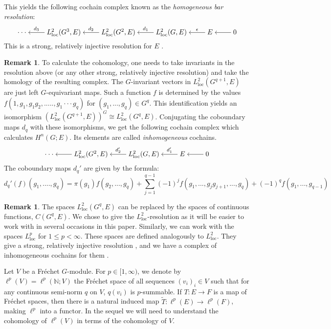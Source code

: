 \documentclass[12pt,reqno]{amsart}
\newcommand{\N}{\mathbb{N}}
\theoremstyle{definition}
\newtheorem{remark}[theorem]{Remark}
\begin{document}
This yields the following cochain complex known as the \emph{homogeneous bar resolution}:
\[
\begin{tikzcd}[cramped]
	{\cdot \cdot \cdot} & {L^2_{\mathrm{loc}}(G^3,E)} & {L^2_{\mathrm{loc}}(G^2,E)} & {L^2_{\mathrm{loc}}(G,E)} & E & 0
	\arrow["{d_3}"', from=1-2, to=1-1]
	\arrow["{d_2}"', from=1-3, to=1-2]
	\arrow["{d_1}"', from=1-4, to=1-3]
	\arrow["\epsilon"', from=1-5, to=1-4]
	\arrow[from=1-6, to=1-5]
\end{tikzcd}
\]
This is a strong, relatively injective resolution for $E$ \cite[Theorem~C.7]{Petersen}.
\begin{remark}\label{rem:inhomogeneous}
    To calculate the cohomology, one needs to take invariants in the resolution above (or any other strong, relatively injective resolution) and take the homology of the resulting complex. The $G$-invariant vectors in $L^2_{\mathrm{loc}}(G^{q+1},E)$ are just left $G$-equivariant maps. Such a function $f$ is determined by the values $f(1,g_1, g_1g_2,.....,g_1\cdot \cdot \cdot g_q)$ for $(g_1,...,g_q) \in G^q$. This identification yields an isomorphism $(L^2_{\mathrm{loc}}(G^{q+1},E))^G \cong L^2_{\mathrm{loc}}(G^q,E)$. Conjugating the coboundary maps $d_q$ with these isomorphisms, we get the following cochain complex which calculates $H^n(G;E)$. Its elements are called \emph{inhomogeneous} cochains.
    \[\begin{tikzcd}[cramped]
	{\cdot\cdot\cdot} & {L^2_{\mathrm{loc}}(G^2,E)} & {L^2_{\mathrm{loc}}(G,E)} & E & 0
	\arrow[from=1-2, to=1-1]
	\arrow["{d_2'}"', from=1-3, to=1-2]
	\arrow["{d_1'}"', from=1-4, to=1-3]
	\arrow[from=1-5, to=1-4]
    \end{tikzcd}\]
The coboundary maps $d_q'$ are given by the formula:    
    $$d_q'(f)(g_1,....,g_q) = \pi(g_1)f(g_2,...,g_q) + \sum_{j=1}^{q-1} (-1)^jf(g_1,...,g_j g_{j+1},...,g_q) + (-1)^q f(g_1,...,g_{q-1})$$
\end{remark}

\begin{remark}\label{rem:lp loc}
    The spaces $L^2_\mathrm{loc}(G^q,E)$ can be replaced by the spaces of continuous functions, $C(G^q,E)$. We chose to give the $L^2_{\mathrm{loc}}$-resolution as it will be easier to work with in several occasions in this paper. Similarly, we can work with the spaces $L^p_{\mathrm{loc}}$ for $1 \leq p < \infty$. These spaces are defined analogously to $L^2_{\mathrm{loc}}$. They give a strong, relatively injective resolution \cite[Corollaire~3.5]{Blanc}, and we have a complex of inhomogeneous cochains for them \cite[Proposition~4.10]{Blanc}.
\end{remark}
Let $V$ be a Fr\'echet $G$-module. For $p \in [1, \infty)$, we denote by $\ell^p(V) = \ell^p(\N;V)$ the Fr\'echet space of all sequences $(v_i)_i \in V$ such that for any continuous semi-norm $q$ on $V$, $q(v_i)$ is $p$-summable. If $T\colon E \to F$ is a map of Fr\'echet spaces, then there is a natural induced map $\tilde{T}\colon \ell^p(E) \to \ell^p(F)$, making $\ell^p$ into a functor. In the sequel we will need to understand the cohomology of $\ell^p(V)$ in terms of the cohomology of $V$.
\end{document}
